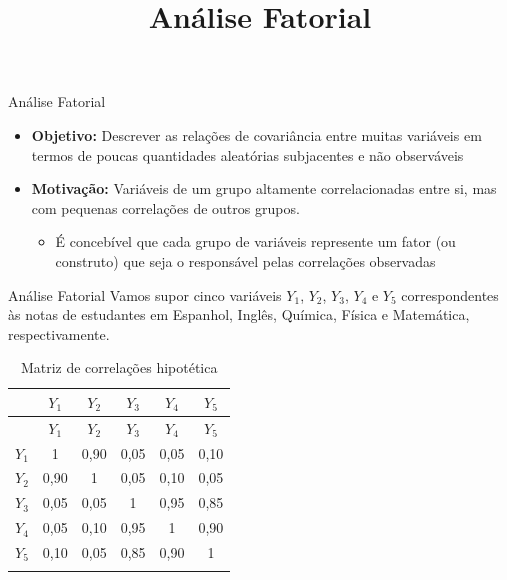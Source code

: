 \documentclass[
  ignorenonframetext,
  aspectratio=169,
]{beamer}
\title{Análise Fatorial}
\author{}
\date{}
\providecommand{\tightlist}{%
  \setlength{\itemsep}{0pt}\setlength{\parskip}{0pt}}
\begin{document}
\frame{\titlepage}


\begin{frame}{Análise Fatorial}
\label{anuxe1lise-fatorial}
\begin{itemize}
\tightlist
\item
  \textbf{Objetivo:} Descrever as relações de covariância entre muitas
  variáveis em termos de poucas quantidades aleatórias subjacentes e não
  observáveis
\end{itemize}

\pause

\begin{itemize}
\tightlist
\item
  \textbf{Motivação:} Variáveis de um grupo altamente correlacionadas
  entre si, mas com pequenas correlações de outros grupos.

  \begin{itemize}
  \tightlist
  \item
    É concebível que cada grupo de variáveis represente um fator (ou
    construto) que seja o responsável pelas correlações observadas
  \end{itemize}
\end{itemize}
\end{frame}

\begin{frame}{Análise Fatorial}
\label{anuxe1lise-fatorial-1}
Vamos supor cinco variáveis \(Y_1\), \(Y_2\), \(Y_3\), \(Y_4\) e \(Y_5\)
correspondentes às notas de estudantes em Espanhol, Inglês, Química,
Física e Matemática, respectivamente.

\begin{longtable}[]{@{}cccccc@{}}
\caption{Matriz de correlações
hipotética}\label{tbl-correlacao}\tabularnewline
\toprule\noalign{}
& \(Y_1\) & \(Y_2\) & \(Y_3\) & \(Y_4\) & \(Y_5\) \\
\midrule\noalign{}
\endfirsthead
\toprule\noalign{}
& \(Y_1\) & \(Y_2\) & \(Y_3\) & \(Y_4\) & \(Y_5\) \\
\midrule\noalign{}
\endhead
\(Y_1\) & 1 & 0,90 & 0,05 & 0,05 & 0,10 \\
\(Y_2\) & 0,90 & 1 & 0,05 & 0,10 & 0,05 \\
\(Y_3\) & 0,05 & 0,05 & 1 & 0,95 & 0,85 \\
\(Y_4\) & 0,05 & 0,10 & 0,95 & 1 & 0,90 \\
\(Y_5\) & 0,10 & 0,05 & 0,85 & 0,90 & 1 \\
\bottomrule\noalign{}
\end{longtable}
\end{frame}
\end{document}
